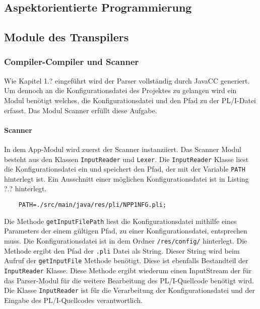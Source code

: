 


\subsection{Aspektorientierte Programmierung}
 
\subsection{Module des Transpilers}
\subsubsection{Compiler-Compiler und Scanner}
Wie Kapitel 1.? eingeführt wird der Parser vollständig durch JavaCC generiert.
Um dennoch an die Konfigurationsdatei des Projektes zu gelangen wird ein Modul benötigt welches,
die Konfigurationsdatei und den Pfad zu der PL/I-Datei erfasst. Das Modul Scanner erfüllt diese Aufgabe.
  
\paragraph{Scanner}

In dem App-Modul wird zuerst der Scanner instanziiert. 
Das Scanner Modul besteht aus den Klassen \verb+InputReader+ und \verb+Lexer+. 
Die \verb+InputReader+ Klasse liest die Konfigurationsdatei ein und speichert den Pfad, der mit der Variable \verb+PATH+
hinterlegt ist. Ein Ausschnitt einer möglichen Konfigurationsdatei ist in Listing ?.? hinterlegt.

\begin{verbatim}
	PATH=./src/main/java/res/pli/NPP1NFG.pli;
\end{verbatim}

Die Methode \verb+getInputFilePath+ liest die Konfigurationsdatei mithilfe eines Parameters der einem gültigen Pfad, zu einer Konfigurationsdatei,
entsprechen muss. Die Konfigurationsdatei ist in dem Ordner \verb+/res/config/+ hinterlegt. 
Die Methode ergibt den Pfad der \verb+.pli+ Datei als String. Dieser String wird beim Aufruf der \verb+getInputFile+ Methode benötigt. Diese ist ebenfalls Bestandteil der \verb+InputReader+ Klasse. Diese Methode ergibt wiederum einen InputStream der für das Parser-Modul für die weitere Bearbeitung des PL/I-Quellcode benötigt wird. Die Klasse \verb+InputReader+ ist für die Verarbeitung der Konfigurationsdatei und der Eingabe des PL/I-Quellcodes verantwortlich.

